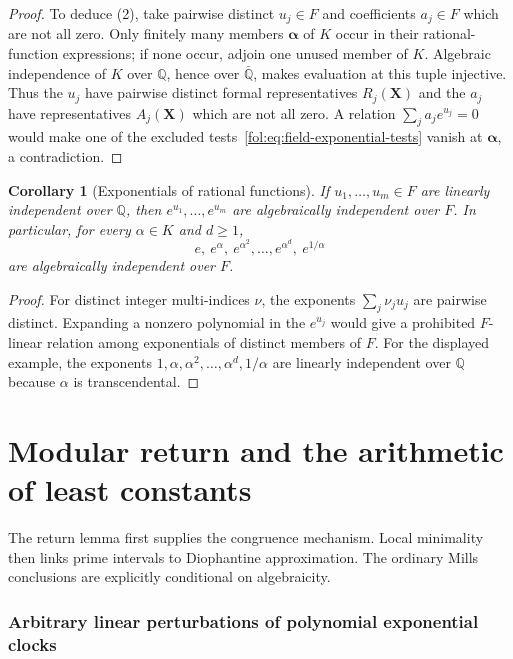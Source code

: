 \documentclass[11pt,a4paper]{article}
\newtheorem{corollary}[theorem]{Corollary}
\theoremstyle{definition}
\theoremstyle{remark}
\numberwithin{equation}{section}
\begin{document}
\begin{proof}
To deduce (2), take pairwise distinct $u_j\in F$ and coefficients
$a_j\in F$ which are not all zero.  Only finitely many members
$\boldsymbol\alpha$ of $K$ occur in their rational-function expressions;
if none occur, adjoin one unused member of $K$.
Algebraic independence of $K$ over $\mathbb Q$, hence over
$\overline{\mathbb Q}$, makes evaluation at this tuple injective.
Thus the $u_j$ have pairwise distinct formal representatives
$R_j(\mathbf X)$ and the $a_j$ have representatives $A_j(\mathbf X)$
which are not all zero.  A relation $\sum_j a_je^{u_j}=0$ would make
one of the excluded tests~\eqref{fol:eq:field-exponential-tests} vanish
at $\boldsymbol\alpha$, a contradiction.
\end{proof}

\begin{corollary}[Exponentials of rational functions]
\label{fol:cor:field-exponential-independence}
If $u_1,\ldots,u_m\in F$ are linearly independent over $\mathbb Q$,
then $e^{u_1},\ldots,e^{u_m}$ are algebraically independent over $F$.
In particular, for every $\alpha\in K$ and $d\ge1$,
\[
 e,\ e^\alpha,\ e^{\alpha^2},\ldots,e^{\alpha^d},\ e^{1/\alpha}
\]
are algebraically independent over $F$.
\end{corollary}

\begin{proof}
For distinct integer multi-indices $\nu$, the exponents
$\sum_j\nu_j u_j$ are pairwise distinct.  Expanding a nonzero polynomial
in the $e^{u_j}$ would give a prohibited $F$-linear relation among
exponentials of distinct members of $F$.
For the displayed example, the exponents
$1,\alpha,\alpha^2,\ldots,\alpha^d,1/\alpha$ are linearly independent
over $\mathbb Q$ because $\alpha$ is transcendental.
\end{proof}




\clearpage
\part{Modular return and the arithmetic of least constants}\label{part:arithmetic}
The return lemma first supplies the congruence mechanism. Local minimality then links prime intervals to Diophantine approximation. The ordinary Mills conclusions are explicitly conditional on algebraicity.

\section{Arbitrary linear perturbations of polynomial exponential clocks}
\label{sur:sec:general-clocks}
\end{document}
